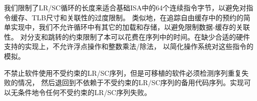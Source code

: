 
\begin{commentary}
  我们限制了LR/SC循环的长度来适合基础ISA中的64个连续指令字节，以避免对指令缓存、TLB尺寸和关联性的过度限制。
  类似地，在追踪自由缓存中的预约的简单实现中，我们不允许循环中有其它的加载和存储，以避免限制数据-缓存的关联性。
  对分支和跳转的约束限制了本可以花费在序列中的时间。在缺少合适的硬件支持的实现上，不允许浮点操作和整数乘法/除法，
  以简化操作系统对这些指令的模拟。

不禁止软件使用不受约束的LR/SC序列，但是可移植的软件必须检测序列重复失败的情况，
然后退回到不依赖于不受约束的LR/SC序列的备用代码序列。实现可以无条件地令任何不受约束的LR/SC序列失败。
\end{commentary}

